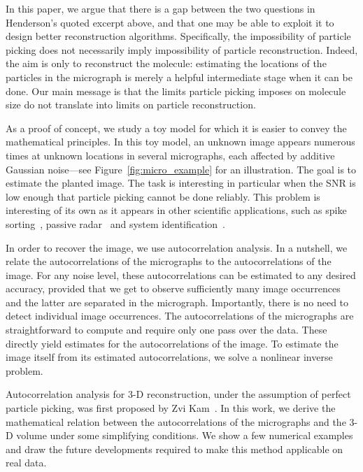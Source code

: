 \documentclass[9pt,twocolumn,twoside,lineno]{pnas-new}
\begin{document}
In this paper, we argue that there is a gap between the two questions in Henderson's quoted excerpt above, and that one may be able to exploit it to design better reconstruction algorithms.
Specifically, the impossibility of particle picking does not necessarily imply impossibility of particle reconstruction.
Indeed, the aim is only to reconstruct the molecule: estimating the locations of the particles in the micrograph is merely a helpful intermediate stage when it can be done. Our main message is that the limits particle picking imposes on molecule size do not translate into limits on particle reconstruction.

As a proof of concept, we study a toy model for which it is easier to convey the mathematical principles. 
In this toy model, an unknown image appears numerous times at unknown locations in several micrographs, each affected by additive Gaussian noise---see Figure~\ref{fig:micro_example} for an illustration.
The goal is to estimate the planted image. The task is interesting in particular when the SNR is low enough that particle picking cannot be done reliably. 
This problem is interesting of its own as it appears in other scientific applications, such as spike sorting~\cite{lewicki1998review}, passive radar~\cite{gogineni2017passive} and system identification~\cite{ljung1998system}.
 
In order to recover the image, we use autocorrelation analysis. In a nutshell, we relate the autocorrelations of the micrographs to the autocorrelations of the image.
For any noise level, these autocorrelations can be estimated to any desired accuracy, provided that we get to observe sufficiently many image occurrences and the latter are separated in the micrograph. Importantly, there is no need to detect individual image occurrences. The autocorrelations of the micrographs are straightforward to compute and require only one pass over the data. These directly yield estimates for the autocorrelations of the image. To estimate the image itself from its estimated autocorrelations, we solve a nonlinear inverse problem. 

Autocorrelation analysis for 3-D reconstruction, under the assumption of perfect particle picking,  was first proposed by Zvi Kam~\cite{kam1980reconstruction}. 
In this work, we derive the mathematical relation between the autocorrelations of the micrographs and the 3-D volume under some simplifying conditions.
We show a few numerical examples and draw the future developments required to make this method applicable on real data. 
\end{document}
